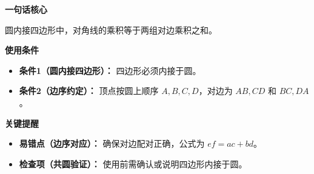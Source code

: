 \begin{summarybox}
	\textbf{\textcolor{CSummary}{一句话核心}}

	圆内接四边形中，对角线的乘积等于两组对边乘积之和。

	\medskip
	\textbf{\textcolor{CSummary}{使用条件}}
	\begin{itemize}[leftmargin=*, itemsep=0.5em, topsep=0.4em]
		\item \textbf{条件1（圆内接四边形）：} 四边形必须内接于圆。
		\item \textbf{条件2（边序约定）：} 顶点按圆上顺序 $A,B,C,D$，对边为 $AB,CD$ 和 $BC,DA$。
	\end{itemize}

	\medskip
	\textbf{\textcolor{CSummary}{关键提醒}}
	\begin{itemize}[leftmargin=*, itemsep=0.5em, topsep=0.4em]
		\item \textbf{易错点（边序对应）：} 确保对边配对正确，公式为 $ef=ac+bd$。
		\item \textbf{检查项（共圆验证）：} 使用前需确认或说明四边形内接于圆。
	\end{itemize}
\end{summarybox}
